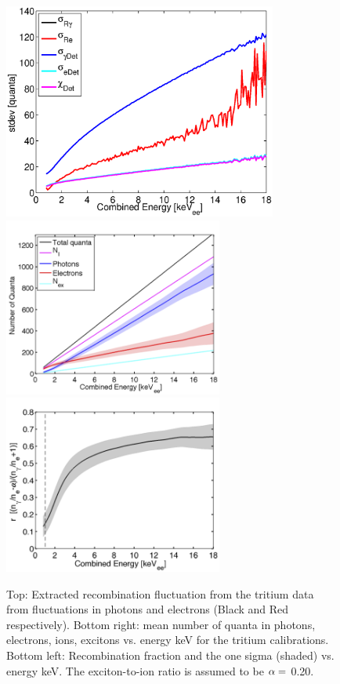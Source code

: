  \begin{figure}[p!]\centering
 \includegraphics[width=90mm]{Chapter_Flucs/Figures/Iter0/std_fig_.eps}
 \includegraphics[width=72mm]{Chapter_Flucs/Figures/Iter0/quanta_.png}
 \includegraphics[width=72mm]{Chapter_Flucs/Figures/Iter0/R_.png}
\caption{Top: Extracted recombination fluctuation from the tritium data from fluctuations in photons and electrons (Black and Red respectively). Bottom right: mean number of quanta in photons, electrons, ions, excitons vs. energy keV for the tritium calibrations. Bottom left: Recombination fraction and the one sigma (shaded) vs. energy keV. The exciton-to-ion ratio is assumed to be $\rm \alpha =$ 0.20.}
\label{fig:Rec_0}
\end{figure}


